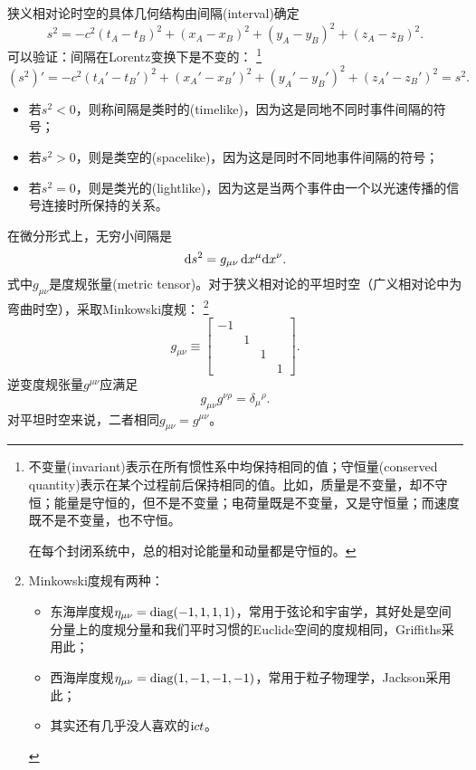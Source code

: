 狭义相对论时空的具体几何结构由间隔(interval)确定
\[
    s^2=-c^2(t_A-t_B)^2+(x_A-x_B)^2+(y_A-y_B)^2+(z_A-z_B)^2.
\]
可以验证：间隔在Lorentz变换下是不变的：
\footnote{
不变量(invariant)表示在所有惯性系中均保持相同的值；守恒量(conserved quantity)表示在某个过程前后保持相同的值。比如，质量是不变量，却不守恒；能量是守恒的，但不是不变量；电荷量既是不变量，又是守恒量；而速度既不是不变量，也不守恒。

在每个封闭系统中，总的相对论能量和动量都是守恒的。
}
\[
    (s^2)'=-c^2(t_A'-t_B')^2+(x_A'-x_B')^2+(y_A'-y_B')^2+(z_A'-z_B')^2=s^2.
\]
\begin{itemize}
    \item 若$s^2<0$，则称间隔是类时的(timelike)，因为这是同地不同时事件间隔的符号；
    \item 若$s^2>0$，则是类空的(spacelike)，因为这是同时不同地事件间隔的符号；
    \item 若$s^2=0$，则是类光的(lightlike)，因为这是当两个事件由一个以光速传播的信号连接时所保持的关系。
\end{itemize}
在微分形式上，无穷小间隔是
\begin{equation}
    \mathop{}\!\mathrm{d} s^2=g_{\mu\nu}\mathop{}\!\mathrm{d} x^\mu\mathrm{d} x^\nu.
\end{equation}
式中$g_{\mu\nu}$是度规张量(metric tensor)。对于狭义相对论的平坦时空（广义相对论中为弯曲时空），采取Minkowski度规：
\footnote{Minkowski度规有两种：
\begin{itemize}
    \item 东海岸度规$\eta_{\mu\nu}=\operatorname{diag}(-1,1,1,1)$，常用于弦论和宇宙学，其好处是空间分量上的度规分量和我们平时习惯的Euclide空间的度规相同，Griffiths采用此；
    \item 西海岸度规$\eta_{\mu\nu}=\operatorname{diag}(1,-1,-1,-1)$，常用于粒子物理学，Jackson采用此；
    \item 其实还有几乎没人喜欢的$\mathrm{i} ct$。
\end{itemize}
}
\begin{equation}
    g_{\mu\nu}\equiv
    \begin{bmatrix}
        -1\\ &1\\ &&1\\ &&&1
    \end{bmatrix}.
\end{equation}
逆变度规张量$g^{\mu\nu}$应满足
\begin{equation}
    g_{\mu\nu}g^{\nu\rho}=\delta_\mu{}^\rho.
\end{equation}
对平坦时空来说，二者相同$g_{\mu\nu}=g^{\mu\nu}$。

